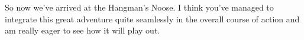 So now we've arrived at the Hangman's Noose. I think you've managed to integrate this great adventure quite seamlessly in the overall course of action and am really eager to see how it will play out.\\

